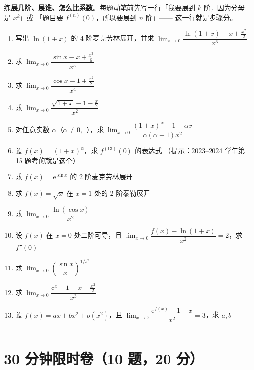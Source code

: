 \documentclass[11pt,a4paper]{ctexart}
\newcommand{\ee}{\mathrm{e}}
\begin{document}
\begin{notebox}[B 组的目标]
练\textbf{展几阶、展谁、怎么比系数}。每题动笔前先写一行「我要展到 $k$ 阶，因为分母是 $x^k$」或
「题目要 $f^{(n)}(0)$，所以要展到 $n$ 阶」—— 这一行就是步骤分。
\end{notebox}

\begin{enumerate}[label=\textbf{B\arabic*.}]
  \item 写出 $\ln(1+x)$ 的 4 阶麦克劳林展开，并求
        $\displaystyle \lim_{x\to0}\dfrac{\ln(1+x)-x+\frac{x^{2}}2}{x^{3}}$
  \item 求 $\displaystyle \lim_{x\to0}\dfrac{\sin x-x+\frac{x^{3}}6}{x^{5}}$
  \item 求 $\displaystyle \lim_{x\to0}\dfrac{\cos x-1+\frac{x^{2}}2}{x^{4}}$
  \item 求 $\displaystyle \lim_{x\to0}\dfrac{\sqrt{1+x}-1-\frac{x}{2}}{x^{2}}$
  \item 对任意实数 $\alpha$（$\alpha\neq0,1$），求
        $\displaystyle \lim_{x\to0}\dfrac{(1+x)^{\alpha}-1-\alpha x}{\alpha(\alpha-1)x^{2}}$
  \item 设 $f(x)=(1+x)^{\alpha}$，求 $f^{(13)}(0)$ 的表达式
        （提示：$2023$--$2024$ 学年第 15 题考的就是这个）
  \item 求 $f(x)=\ee^{\sin x}$ 的 2 阶麦克劳林展开
  \item 求 $f(x)=\sqrt{x}$ 在 $x=1$ 处的 2 阶泰勒展开
  \item 求 $\displaystyle \lim_{x\to0}\dfrac{\ln(\cos x)}{x^{2}}$
  \item 设 $f(x)$ 在 $x=0$ 处二阶可导，且
        $\displaystyle \lim_{x\to0}\dfrac{f(x)-\ln(1+x)}{x^{2}}=2$，求 $f''(0)$
  \item 求 $\displaystyle \lim_{x\to0}\left(\dfrac{\sin x}{x}\right)^{1/x^{2}}$
  \item 求 $\displaystyle \lim_{x\to0}\dfrac{\ee^{x}-1-x-\frac{x^{2}}2}{x^{3}}$
  \item 设 $f(x)=ax+bx^{2}+o(x^{2})$，且
        $\displaystyle \lim_{x\to0}\dfrac{\ee^{f(x)}-1-x}{x^{2}}=3$，求 $a,b$
\end{enumerate}

\vspace{2em}
\noindent\rule{\textwidth}{0.4pt}
\newpage

\section{30 分钟限时卷（10 题，20 分）}
\end{document}
